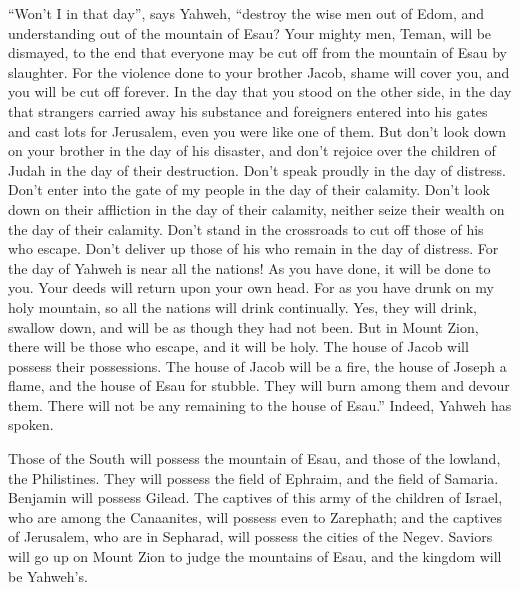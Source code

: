  ``Won't I in that day'', says Yahweh, ``destroy the wise
men out of Edom, and understanding out of the mountain of Esau?
 Your mighty men, Teman, will be dismayed, to the end that
everyone may be cut off from the mountain of Esau by slaughter.
 For the violence done to your brother Jacob, shame will
cover you, and you will be cut off forever.  In the day
that you stood on the other side, in the day that strangers carried away
his substance and foreigners entered into his gates and cast lots for
Jerusalem, even you were like one of them.  But don't look
down on your brother in the day of his disaster, and don't rejoice over
the children of Judah in the day of their destruction. Don't speak
proudly in the day of distress.  Don't enter into the gate
of my people in the day of their calamity. Don't look down on their
affliction in the day of their calamity, neither seize their wealth on
the day of their calamity.  Don't stand in the crossroads
to cut off those of his who escape. Don't deliver up those of his who
remain in the day of distress.  For the day of Yahweh is
near all the nations! As you have done, it will be done to you. Your
deeds will return upon your own head.  For as you have
drunk on my holy mountain, so all the nations will drink continually.
Yes, they will drink, swallow down, and will be as though they had not
been.  But in Mount Zion, there will be those who escape,
and it will be holy. The house of Jacob will possess their possessions.
 The house of Jacob will be a fire, the house of Joseph a
flame, and the house of Esau for stubble. They will burn among them and
devour them. There will not be any remaining to the house of Esau.''
Indeed, Yahweh has spoken.

 Those of the South will possess the mountain of Esau, and
those of the lowland, the Philistines. They will possess the field of
Ephraim, and the field of Samaria. Benjamin will possess Gilead.
 The captives of this army of the children of Israel, who
are among the Canaanites, will possess even to Zarephath; and the
captives of Jerusalem, who are in Sepharad, will possess the cities of
the Negev.  Saviors will go up on Mount Zion to judge the
mountains of Esau, and the kingdom will be Yahweh's.
